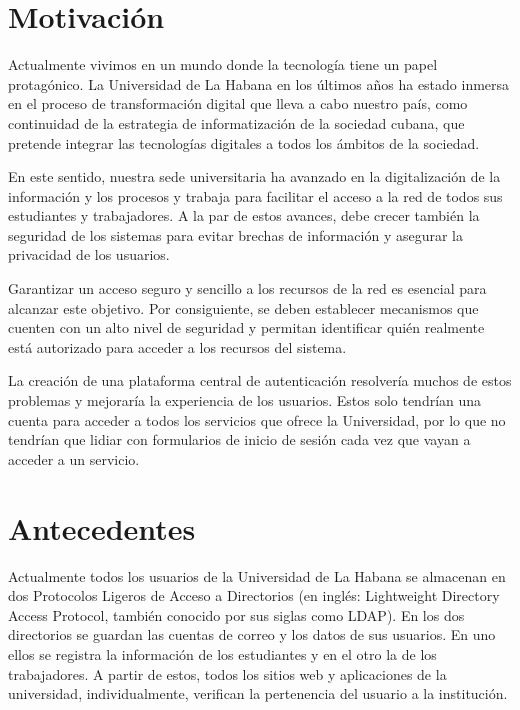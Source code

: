 \section*{Motivación}
Actualmente vivimos en un mundo donde la tecnología tiene un papel protagónico. La Universidad de La Habana en los últimos años ha estado inmersa en el proceso de transformación digital que lleva a cabo nuestro país, como continuidad de la estrategia de informatización de la sociedad cubana, que pretende integrar las tecnologías digitales a todos los ámbitos de la sociedad.

En este sentido, nuestra sede universitaria ha avanzado en la digitalización de la información y los procesos y trabaja para facilitar el acceso a la red de todos sus estudiantes y trabajadores. A la par de estos avances, debe crecer también la seguridad de los sistemas para evitar brechas de información y asegurar la privacidad de los usuarios.

Garantizar un acceso seguro y sencillo a los recursos de la red es esencial para alcanzar este objetivo. Por consiguiente, se deben establecer mecanismos que cuenten con un alto nivel de seguridad y permitan identificar quién realmente está autorizado para acceder a los recursos del sistema.

La creación de una plataforma central de autenticación resolvería muchos de estos problemas y mejoraría la experiencia de los usuarios. Estos solo tendrían una cuenta para acceder a todos los servicios que ofrece la Universidad, por lo que no tendrían que lidiar con formularios de inicio de sesión cada vez que vayan a acceder a un servicio.


\section*{Antecedentes}

Actualmente todos los usuarios de la Universidad de La Habana se almacenan en dos Protocolos Ligeros de Acceso a Directorios (en inglés: Lightweight Directory Access Protocol, también conocido por sus siglas como LDAP). En los dos directorios se guardan las cuentas de correo y los datos de sus usuarios. En uno ellos se registra la información de los estudiantes y en el otro la de los trabajadores. A partir de estos, todos los sitios web y aplicaciones de la universidad, individualmente, verifican la pertenencia del usuario a la institución.

